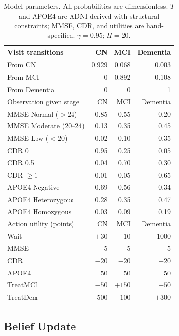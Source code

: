\documentclass[conference,a4paper]{IEEEtran}
\begin{document}
\begin{table}[!t]
\caption{Model parameters. All probabilities are dimensionless.
$T$ and APOE4 are ADNI-derived with structural constraints; MMSE,
CDR, and utilities are hand-specified. $\gamma=0.95$; $H=20$.}
\label{tab:model}
\centering
\footnotesize
\setlength{\tabcolsep}{4pt}
\renewcommand{\arraystretch}{1.05}
\begin{tabular}{lrrr}
\hline
Visit transitions & CN & MCI & Dementia\\
\hline
From CN       & 0.929 & 0.068 & 0.003\\
From MCI      & 0     & 0.892 & 0.108\\
From Dementia & 0     & 0     & 1\\
\hline
Observation given stage & CN & MCI & Dementia\\
\hline
MMSE Normal ($>24$)   & 0.85 & 0.55 & 0.20\\
MMSE Moderate (20--24)& 0.13 & 0.35 & 0.45\\
MMSE Low ($<20$)      & 0.02 & 0.10 & 0.35\\
CDR 0                & 0.95 & 0.25 & 0.05\\
CDR 0.5              & 0.04 & 0.70 & 0.30\\
CDR $\geq1$          & 0.01 & 0.05 & 0.65\\
APOE4 Negative       & 0.69 & 0.56 & 0.34\\
APOE4 Heterozygous   & 0.28 & 0.35 & 0.47\\
APOE4 Homozygous     & 0.03 & 0.09 & 0.19\\
\hline
Action utility (points) & CN & MCI & Dementia\\
\hline
Wait    & $+30$ & $-10$ & $-1000$\\
MMSE    & $-5$ & $-5$ & $-5$\\
CDR     & $-20$ & $-20$ & $-20$\\
APOE4   & $-50$ & $-50$ & $-50$\\
TreatMCI& $-50$ & $+150$ & $-50$\\
TreatDem& $-500$ & $-100$ & $+300$\\
\hline
\end{tabular}
\end{table}

\subsection{Belief Update}
\end{document}
